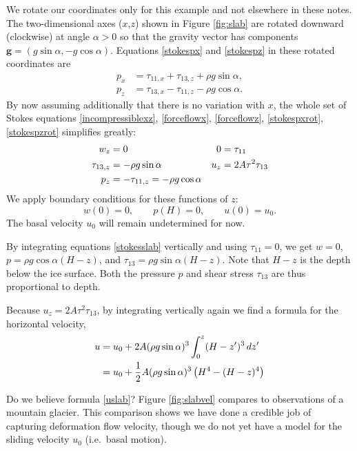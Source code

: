 \documentclass[letterpaper,final,12pt,reqno]{amsart}
\begin{document}
We rotate our coordinates only for this example and not elsewhere in these notes.  The two-dimensional axes ($x$,$z$) shown in Figure \ref{fig:slab} are rotated downward (clockwise) at angle $\alpha>0$ so that the gravity vector has components $\mathbf{g} = (g \sin\alpha,- g \cos \alpha)$.  Equations \eqref{stokespx} and \eqref{stokespz} in these rotated coordinates are
\begin{align}
p_x &= \tau_{11,x} + \tau_{13,z} + \rho g \sin\alpha, \label{stokespxrot} \\
p_z &= \tau_{13,x} - \tau_{11,z} - \rho g \cos\alpha. \label{stokespzrot}
\end{align}
By now assuming additionally that there is no variation with $x$, the whole set of Stokes equations \eqref{incompressiblexz}, \eqref{forceflowx}, \eqref{forceflowz}, \eqref{stokespxrot}, \eqref{stokespzrot} simplifies greatly:
\begin{align}
w_z &= 0 &   0 &= \tau_{11} \label{stokesslab} \\
\tau_{13,z} &= - \rho g \sin\alpha &   u_z &= 2 A \tau^2 \tau_{13} \notag \\
p_z &= -\tau_{11,z} = - \rho g \cos\alpha \notag
\end{align}
We apply boundary conditions for these functions of $z$:
	$$w(0)=0, \qquad p(H)=0, \qquad u(0)=u_0.$$
The basal velocity $u_0$ will remain undetermined for now.

By integrating equations \eqref{stokesslab} vertically and using $\tau_{11}=0$, we get $w=0$, $p = \rho g \cos\alpha (H-z)$, and $\tau_{13} = \rho g \sin\alpha (H-z)$.  Note that $H-z$ is the depth below the ice surface.  Both the pressure $p$ and shear stress $\tau_{13}$ are thus proportional to depth.

Because $u_z = 2 A \tau^2 \tau_{13}$, by integrating vertically again we find a formula for the horizontal velocity,
\begin{align}
u &= u_0 + 2 A (\rho g \sin\alpha)^3 \int_0^z (H-z')^3\,dz' \notag \\
  &= u_0 + \frac{1}{2} A (\rho g \sin\alpha)^3  \left(H^4 - (H-z)^4\right)  \label{uslab}
\end{align}

Do we believe formula \eqref{uslab}?  Figure \ref{fig:slabvel} compares to observations of a mountain glacier.  This comparison shows we have done a credible job of capturing deformation flow velocity, though we do not yet have a model for the sliding velocity $u_0$ (i.e.~basal motion).  
\end{document}
